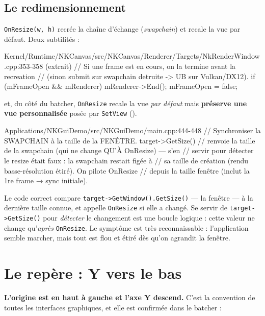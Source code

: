 \subsection{Le redimensionnement}

\texttt{OnResize(w, h)} recrée la chaîne d'échange (\emph{swapchain}) et recale
la vue par défaut. Deux subtilités :

\begin{nkcode}{Kernel/Runtime/NKCanvas/src/NKCanvas/Renderer/Targets/NkRenderWindow.cpp:353-358 (extrait)}
// Si une frame est en cours, on la termine avant la recreation
// (sinon submit sur swapchain detruite -> UB sur Vulkan/DX12).
if (mFrameOpen && mRenderer) { mRenderer->End(); mFrameOpen = false; }
\end{nkcode}

et, du côté du batcher, \texttt{OnResize} recale la vue \emph{par défaut} mais
\textbf{préserve une vue personnalisée} posée par \texttt{SetView}
().

\begin{nkpiege}
\begin{nkcode}{Applications/NKGuiDemo/src/NKGuiDemo/main.cpp:444-448}
        // Synchroniser la SWAPCHAIN à la taille de la FENÊTRE. target->GetSize()
        // renvoie la taille de la swapchain (qui ne change QU'À OnResize) — s'en
        // servir pour détecter le resize était faux : la swapchain restait figée à
        // sa taille de création (rendu basse-résolution étiré). On pilote OnResize
        // depuis la taille fenêtre (inclut la 1re frame → sync initiale).
\end{nkcode}
Le code correct compare \texttt{target->GetWindow().GetSize()} — la fenêtre — à
la dernière taille connue, et appelle \texttt{OnResize} si elle a changé. Se
servir de \texttt{target->GetSize()} pour \emph{détecter} le changement est une
boucle logique : cette valeur ne change qu'\emph{après} \texttt{OnResize}. Le
symptôme est très reconnaissable : l'application semble marcher, mais tout est
flou et étiré dès qu'on agrandit la fenêtre.
\end{nkpiege}

\section{Le repère : Y vers le bas}

\textbf{L'origine est en haut à gauche et l'axe Y descend.} C'est la convention
de toutes les interfaces graphiques, et elle est confirmée dans le batcher :

